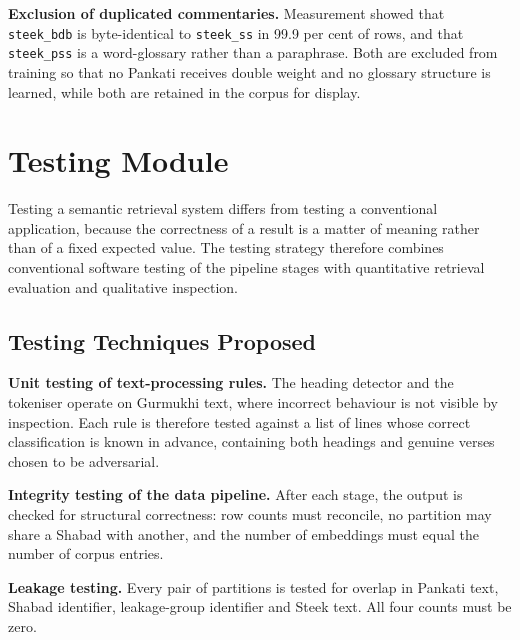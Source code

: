 \documentclass[12pt,a4paper]{article}
\begin{document}
\vspace{0.3cm}

\noindent\textbf{Exclusion of duplicated commentaries.}
Measurement showed that \texttt{steek\_bdb} is byte-identical to \texttt{steek\_ss} in 99.9 per cent of rows, and that \texttt{steek\_pss} is a word-glossary rather than a paraphrase. Both are excluded from training so that no Pankati receives double weight and no glossary structure is learned, while both are retained in the corpus for display.

\newpage
\section{Testing Module}

Testing a semantic retrieval system differs from testing a conventional application, because the correctness of a result is a matter of meaning rather than of a fixed expected value. The testing strategy therefore combines conventional software testing of the pipeline stages with quantitative retrieval evaluation and qualitative inspection.

\subsection{Testing Techniques Proposed}

\noindent\textbf{Unit testing of text-processing rules.}
The heading detector and the tokeniser operate on Gurmukhi text, where incorrect behaviour is not visible by inspection. Each rule is therefore tested against a list of lines whose correct classification is known in advance, containing both headings and genuine verses chosen to be adversarial.

\vspace{0.3cm}

\noindent\textbf{Integrity testing of the data pipeline.}
After each stage, the output is checked for structural correctness: row counts must reconcile, no partition may share a Shabad with another, and the number of embeddings must equal the number of corpus entries.

\vspace{0.3cm}

\noindent\textbf{Leakage testing.}
Every pair of partitions is tested for overlap in Pankati text, Shabad identifier, leakage-group identifier and Steek text. All four counts must be zero.
\end{document}
